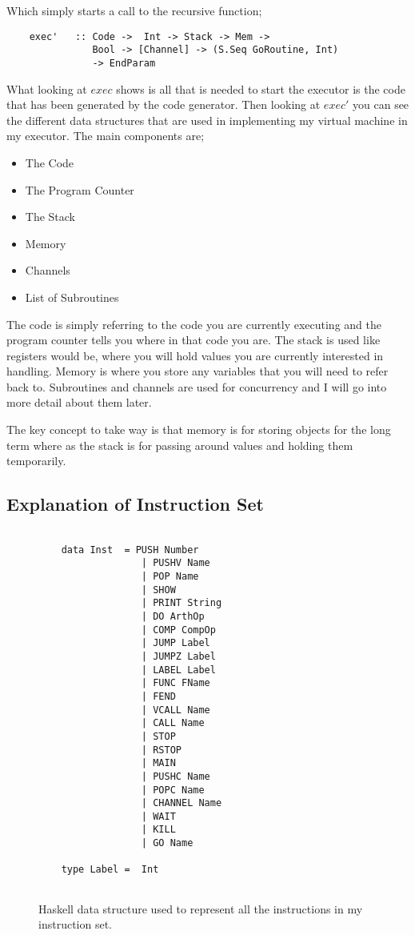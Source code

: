 Which simply starts a call to the recursive function;

\begin{lstlisting}
	exec' 	:: Code ->  Int -> Stack -> Mem -> 
	           Bool -> [Channel] -> (S.Seq GoRoutine, Int) 
	           -> EndParam
\end{lstlisting}

\newpage

What looking at $exec$ shows is all that is needed to start the executor is the code that has been generated by the code generator. Then looking at $exec'$ you can see the different data structures that are used in implementing my virtual machine in my executor. The main components are;

\begin{itemize}
\item The Code
\item The Program Counter
\item The Stack
\item Memory
\item Channels
\item List of Subroutines
\end{itemize}

The code is simply referring to the code you are currently executing and the program counter tells you where in that code you are. The stack is used like registers would be, where you will hold values you are currently interested in handling. Memory is where you store any variables that you will need to refer back to. Subroutines and channels are used for concurrency and I will go into more detail about them later. 

The key concept to take way is that memory is for storing objects for the long term where as the stack is for passing around values and holding them temporarily.

\subsection{Explanation of Instruction Set}

\begin{figure}[h]
\centering
\begin{lstlisting}

	data Inst  = PUSH Number
	              | PUSHV Name
	              | POP Name
	              | SHOW
	              | PRINT String  
      		      | DO ArthOp
       		      | COMP CompOp
       		      | JUMP Label
      		      | JUMPZ Label
      		      | LABEL Label
      		      | FUNC FName
      		      | FEND
      		      | VCALL Name
      		      | CALL Name
      		      | STOP
      		      | RSTOP
      		      | MAIN
      		      | PUSHC Name
      		      | POPC Name
      		      | CHANNEL Name
      		      | WAIT
      		      | KILL
      		      | GO Name 
	
	type Label =  Int


\end{lstlisting}
\caption{Haskell data structure used to represent all the instructions in my instruction set.}
\label{fig:instData} 
\end{figure}

